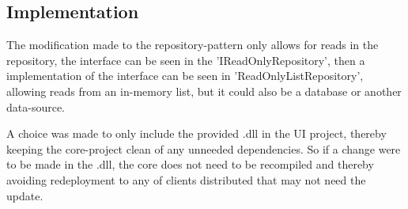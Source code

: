 \subsection{Implementation}

The modification made to the repository-pattern only allows for reads in the repository, the interface can be seen in the 'IReadOnlyRepository', then a implementation of the interface can be seen in 'ReadOnlyListRepository', allowing reads from an in-memory list, but it could also be a database or another data-source.

A choice was made to only include the provided .dll in the UI project, thereby keeping the core-project clean of any unneeded dependencies. So if a change were to be made in the .dll, the core does not need to be recompiled and thereby avoiding redeployment to any of clients distributed that may not need the update. 

\clearpage
